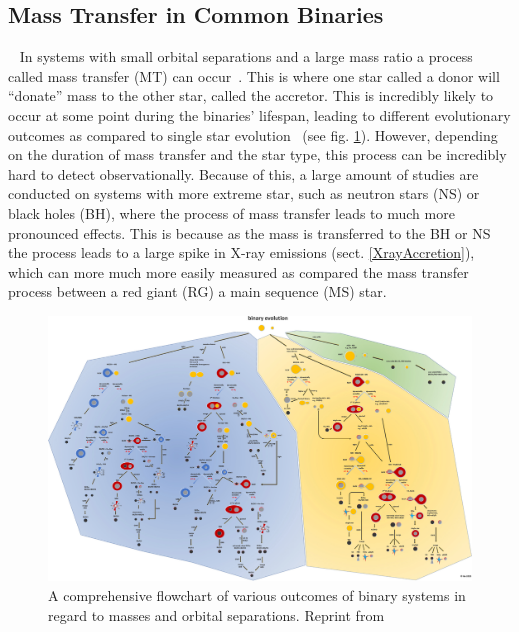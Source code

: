 \documentclass[12pt, a4paper]{article}
\begin{document}
    \subsection{Mass Transfer in Common Binaries}~\label{MassTransferinCommon}
    In systems with small orbital separations and a large mass ratio a process called mass transfer (MT) can occur~\cite{TaurisvandenHeuvel+2023}. This is where one star called a donor will ``donate'' mass to the other star, called the accretor. This is incredibly likely to occur at some point during the binaries' lifespan, leading to different evolutionary outcomes as compared to single star evolution~\cite{TaurisvandenHeuvel+20230} (see fig. \ref{fig:binary_evolution_flowchart}). However, depending on the duration of mass transfer and the star type, this process can be incredibly hard to detect observationally. Because of this, a large amount of studies are conducted on systems with more extreme star, such as neutron stars (NS) or black holes (BH), where the process of mass transfer leads to much more pronounced effects. This is because as the mass is transferred to the BH or NS the process leads to a large spike in X-ray emissions (sect. \ref{XrayAccretion}), which can more much more easily measured as compared the mass transfer process between a red giant (RG) a main sequence (MS) star.

    \vspace*{\fill}
    \begin{figure}[H]
        \centering
        \includegraphics[width=\textwidth]{figs/Binary Evolution Flowchart.jpg}
        \caption{A comprehensive flowchart of various outcomes of binary systems in regard to masses and orbital separations. Reprint from \cite{Chen_2024}}
        \label{fig:binary_evolution_flowchart}
    \end{figure}
    \vspace*{\fill}
    \restoregeometry
\end{document}

